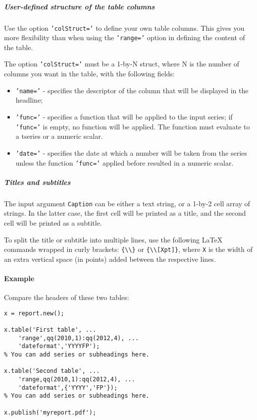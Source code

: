 \subparagraph{User-defined structure of the table
columns}

Use the option \texttt{'colStruct='} to define your own table columns.
This gives you more flexibility than when using the \texttt{'range='}
option in defining the content of the table.

The option \texttt{'colStruct='} must be a 1-by-N struct, where N is the
number of columns you want in the table, with the following fields:

\begin{itemize}
\item
  \texttt{'name='} - specifies the descriptor of the column that will be
  displayed in the headline;
\item
  \texttt{'func='} - specifies a function that will be applied to the
  input series; if \texttt{'func='} is empty, no function will be
  applied. The function must evaluate to a tseries or a numeric scalar.
\item
  \texttt{'date='} - specifies the date at which a number will be taken
  from the series unless the function \texttt{'func='} applied before
  resulted in a numeric scalar.
\end{itemize}

\subparagraph{Titles and subtitles}

The input argument \texttt{Caption} can be either a text string, or a
1-by-2 cell array of strings. In the latter case, the first cell will be
printed as a title, and the second cell will be printed as a subtitle.

To split the title or subtitle into multiple lines, use the following
LaTeX commands wrapped in curly brackets:
\texttt{\{\textbackslash{}\textbackslash{}\}} or
\texttt{\{\textbackslash{}\textbackslash{}{[}Xpt{]}\}}, where \texttt{X}
is the width of an extra vertical space (in points) added between the
respective lines.

\paragraph{Example}

Compare the headers of these two tables:

\begin{verbatim}
x = report.new();

x.table('First table', ...
    'range',qq(2010,1):qq(2012,4), ...
    'dateformat','YYYYFP');
% You can add series or subheadings here.

x.table('Second table', ...
    'range,qq(2010,1):qq(2012,4), ...
    'dateformat',{'YYYY','FP'});
% You can add series or subheadings here.

x.publish('myreport.pdf');
\end{verbatim}


